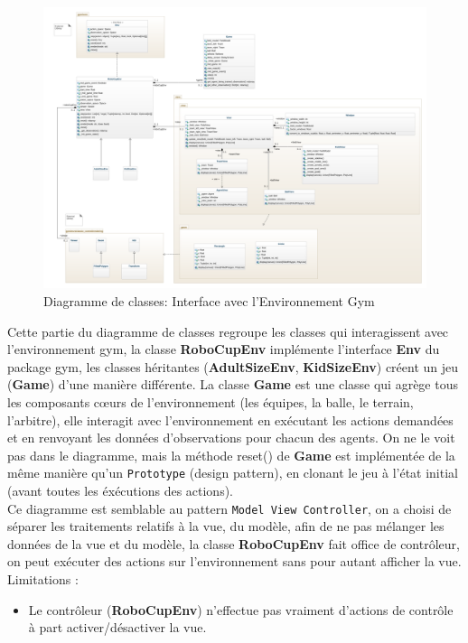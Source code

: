 \documentclass[11pt, a4paper]{article}
\begin{document}
	\begin{figure}[H]
		\centering
		\includegraphics[scale=0.30]{images/robocup-env.png}
		\caption {Diagramme de classes: Interface avec l'Environnement Gym  }
	\end{figure}

	Cette partie du diagramme de classes regroupe les classes qui interagissent avec l'environnement gym,
	la classe \textbf{RoboCupEnv} implémente l'interface \textbf{Env} du package gym, les classes héritantes (\textbf{AdultSizeEnv}, \textbf{KidSizeEnv})
	créent un jeu (\textbf{Game}) d'une manière différente.
	La classe \textbf{Game} est une classe qui agrège tous les composants cœurs de l'environnement (les équipes, la balle, le terrain, l'arbitre), elle interagit avec l'environnement
	en exécutant les actions demandées et en renvoyant les données d'observations pour chacun des agents.
	On ne le voit pas dans le diagramme, mais la méthode reset() de \textbf{Game} est implémentée de la même manière qu'un \texttt{Prototype} (design pattern), en clonant
	le jeu à l'état initial (avant toutes les éxécutions des actions). \\
	Ce diagramme est semblable au pattern \texttt{Model View Controller}, on a choisi de séparer les traitements relatifs à la vue, du modèle, afin de ne pas
	mélanger les données de la vue et du modèle, la classe
	\textbf{RoboCupEnv} fait office de contrôleur, on peut exécuter des actions sur l'environnement sans pour autant afficher la vue.
	\\
	\noindent Limitations : \\
	\begin{itemize}
		\item Le contrôleur (\textbf{RoboCupEnv}) n'effectue pas vraiment d'actions de contrôle à part activer/désactiver la vue.
	\end{itemize}
\end{document}
